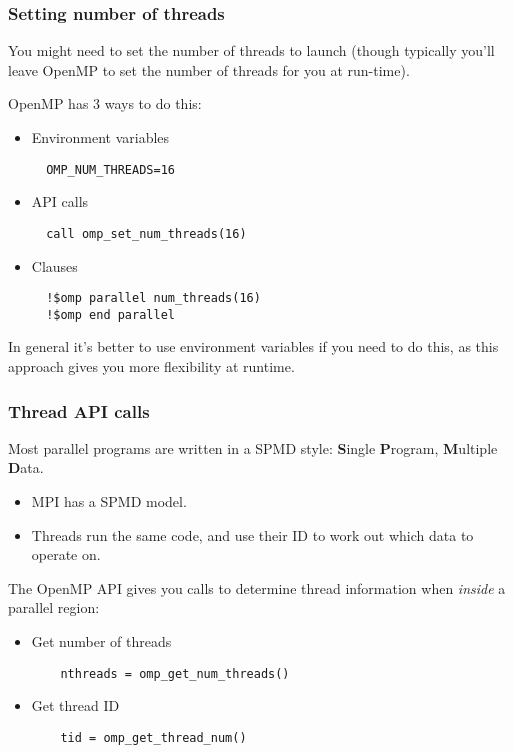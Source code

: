 \documentclass{beamer}
\begin{document}
\begin{frame}[fragile]
\frametitle{Setting number of threads}
You might need to set the number of threads to launch (though typically you'll leave OpenMP to set the number of threads for you at run-time).

OpenMP has 3 ways to do this:
\begin{itemize}
  \item Environment variables
  \begin{verbatim}
  OMP_NUM_THREADS=16
  \end{verbatim}

  \item API calls
  \begin{verbatim}
  call omp_set_num_threads(16)
  \end{verbatim}

  \item Clauses
  \begin{verbatim}
  !$omp parallel num_threads(16)
  !$omp end parallel
  \end{verbatim}
\end{itemize}

In general it's better to use environment variables if you need to do this, as this approach gives you more flexibility at runtime.
\end{frame}

\begin{frame}[fragile]
\frametitle{Thread API calls}
Most parallel programs are written in a SPMD style: {\bf S}ingle {\bf P}rogram, {\bf M}ultiple {\bf D}ata.
\begin{itemize}
  \item MPI has a SPMD model.
  \item Threads run the same code, and use their ID to work out which data to operate on.
\end{itemize}

The OpenMP API gives you calls to determine thread information when \emph{inside} a parallel region:
\begin{itemize}
  \item Get number of threads
    \begin{verbatim}
    nthreads = omp_get_num_threads()
    \end{verbatim}

  \item Get thread ID
    \begin{verbatim}
    tid = omp_get_thread_num()
    \end{verbatim}

\end{itemize}
\end{frame}
\end{document}

